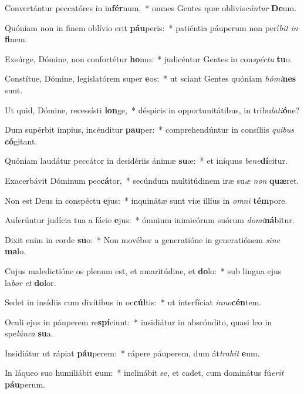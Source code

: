 \item Convertántur peccatóres in in\textbf{fér}num,~* omnes Gentes quæ oblivis\textit{cún}\textit{tur} \textbf{De}um.
\item Quóniam non in finem oblívio erit \textbf{páu}peris:~* patiéntia páuperum non perí\textit{bit} \textit{in} \textbf{fi}nem.
\item Exsúrge, Dómine, non confortétur \textbf{ho}mo:~* judicéntur Gentes in con\textit{spéc}\textit{tu} \textbf{tu}o.
\item Constítue, Dómine, legislatórem super \textbf{e}os:~* ut sciant Gentes quóniam \textit{hó}\textit{mi}\textbf{nes} sunt.
\item Ut quid, Dómine, recessísti \textbf{lon}ge,~* déspicis in opportunitátibus, in tribu\textit{la}\textit{ti}\textbf{ó}ne?
\item Dum supérbit ímpius, incénditur \textbf{pau}per:~* comprehendúntur in consíliis \textit{qui}\textit{bus} \textbf{có}gitant.
\item Quóniam laudátur peccátor in desidériis ánimæ \textbf{su}æ:~* et iníquus \textit{be}\textit{ne}\textbf{dí}citur.
\item Exacerbávit Dóminum pec\textbf{cá}tor,~* secúndum multitúdinem iræ su\textit{æ} \textit{non} \textbf{quæ}ret.
\item Non est Deus in conspéctu \textbf{e}jus:~* inquinátæ sunt viæ illíus in \textit{om}\textit{ni} \textbf{tém}pore.
\item Auferúntur judícia tua a fácie \textbf{e}jus:~* ómnium inimicórum suórum \textit{do}\textit{mi}\textbf{ná}bitur.
\item Dixit enim in corde \textbf{su}o:~* Non movébor a generatióne in generatiónem \textit{si}\textit{ne} \textbf{ma}lo.
\item Cujus maledictióne os plenum est, et amaritúdine, et \textbf{do}lo:~* sub lingua ejus la\textit{bor} \textit{et} \textbf{do}lor.
\item Sedet in insídiis cum divítibus in oc\textbf{cúl}tis:~* ut interfíciat \textit{in}\textit{no}\textbf{cén}tem.
\item Oculi ejus in páuperem re\textbf{spí}ciunt:~* insidiátur in abscóndito, quasi leo in spe\textit{lún}\textit{ca} \textbf{su}a.
\item Insidiátur ut rápiat \textbf{páu}perem:~* rápere páuperem, dum át\textit{tra}\textit{hit} \textbf{e}um.
\item In láqueo suo humiliábit \textbf{e}um:~* inclinábit se, et cadet, cum dominátus fú\textit{e}\textit{rit} \textbf{páu}perum.
